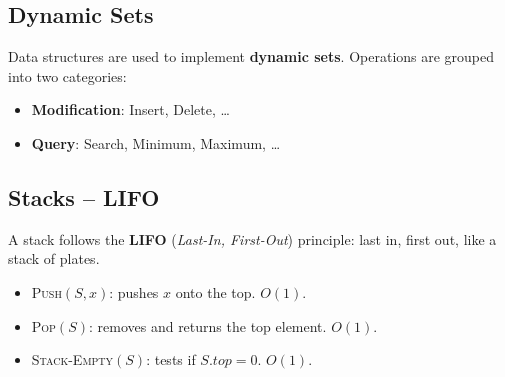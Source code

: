 \subsection{Dynamic Sets}

Data structures are used to implement \textbf{dynamic sets}.
Operations are grouped into two categories:

\begin{itemize}
  \item \textbf{Modification}: Insert, Delete, \dots
  \item \textbf{Query}: Search, Minimum, Maximum, \dots
\end{itemize}

\subsection{Stacks -- LIFO}

A stack follows the \textbf{LIFO} (\textit{Last-In, First-Out}) principle: last in,
first out, like a stack of plates.

\begin{center}
\end{center}

\begin{itemize}
  \item \textsc{Push}$(S, x)$: pushes $x$ onto the top. $O(1)$.
  \item \textsc{Pop}$(S)$: removes and returns the top element. $O(1)$.
  \item \textsc{Stack-Empty}$(S)$: tests if $S.\mathit{top} = 0$. $O(1)$.
\end{itemize}

